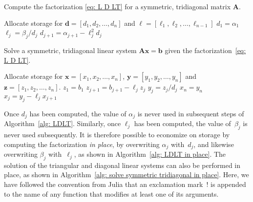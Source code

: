 \begin{algorithm}
\caption{Compute the factorization \eqref{eq: L D LT} for a symmetric, 
tridiagonal matrix $\boldsymbol{A}$.}
\label{alg: LDLT}
\begin{algorithmic}
\Statex
{}
\State Allocate storage for $\boldsymbol{d}=[d_1,d_2,\ldots, d_n]$ and
$\boldsymbol{\ell}=[\ell_1,\ell_2,\ldots,\ell_{n-1}]$
\State $d_1=\alpha_1$
\State $\ell_j=\beta_j/d_j$
\State $d_{j+1}=\alpha_{j+1}-\ell_j^2d_j$
\EndFor
\State{}
\EndFunction
\end{algorithmic}
\end{algorithm}

\begin{algorithm}
\caption{Solve a symmetric, tridiagonal linear system 
$\boldsymbol{A}\boldsymbol{x}=\boldsymbol{b}$ given the 
factorization~\eqref{eq: L D LT}.}
\label{alg: solve symmetric tridiagonal}
\begin{algorithmic}
\Statex
{}
\State Allocate storage for $\boldsymbol{x}=[x_1,x_2,\ldots,x_n]$,
$\boldsymbol{y}=[y_1,y_2,\ldots,y_n]$ and $\boldsymbol{z}=[z_1,z_2,\ldots,z_n]$.
\State $z_1=b_1$
\State $z_{j+1}=b_{j+1}-\ell_jz_j$
\EndFor
{}
\State $y_j=z_j/d_j$
\EndFor
\State $x_n=y_n$
\State $x_j=y_j-\ell_jx_{j+1}$
\EndFor
\State{}
\EndFunction
\end{algorithmic}
\end{algorithm}

Once $d_j$ has been computed, the value of $\alpha_j$ is never used in 
subsequent steps of Algorithm~\ref{alg: LDLT}. Similarly, once $\ell_j$ has been 
computed, the value of~$\beta_j$ is never used subsequently.  It is therefore 
possible to economize on storage by computing the factorization 
\emph{in place}, by overwriting $\alpha_j$ with~$d_j$,
and likewise overwriting $\beta_j$ with~$\ell_j$, as shown in 
Algorithm~\ref{alg: LDLT in place}.  The solution of the triangular and 
diagonal linear systems can also be performed in place, as shown in 
Algorithm~\ref{alg: solve symmetric tridiagonal in place}.  Here, we have 
followed the convention from Julia that an exclamation mark~! is appended to 
the name of any function that modifies at least one of its arguments.

